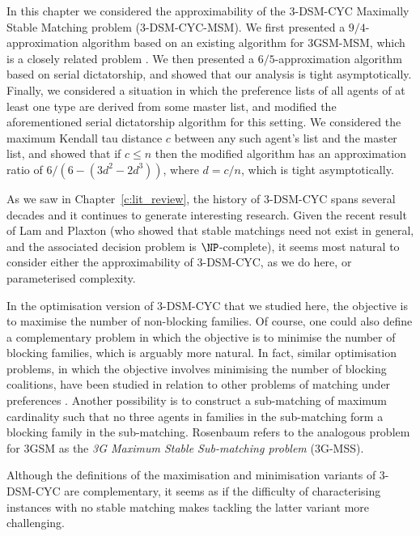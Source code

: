 In this chapter we considered the approximability of the 3-DSM-CYC Maximally Stable Matching problem (3-DSM-CYC-MSM). We first presented a $9/4$-approximation algorithm based on an existing algorithm for 3GSM-MSM, which is a closely related problem \cite{rosenbaum16}. We then presented a $6/5$-approximation algorithm based on serial dictatorship, and showed that our analysis is tight asymptotically. Finally, we considered a situation in which the preference lists of all agents of at least one type are derived from some master list, and modified the aforementioned serial dictatorship algorithm for this setting. We considered the maximum Kendall tau distance $c$ between any such agent's list and the master list, and showed that if $c \leq n$ then the modified algorithm has an approximation ratio of $6 / (6 - (3d^2 - 2d^3))$, where $d = c/n$, which is tight asymptotically.

As we saw in Chapter~\ref{c:lit_review}, the history of 3-DSM-CYC spans several decades and it continues to generate interesting research. Given the recent result of Lam and Plaxton \cite{Plaxton3DSMCYCJournal} (who showed that stable matchings need not exist in general, and the associated decision problem is $\NP$-complete), it seems most natural to consider either the approximability of 3-DSM-CYC, as we do here, or parameterised complexity. 

In the optimisation version of 3-DSM-CYC that we studied here, the objective is to maximise the number of non-blocking families. Of course, one could also define a complementary problem in which the objective is to minimise the number of blocking families, which is arguably more natural. In fact, similar optimisation problems, in which the objective involves minimising the number of blocking coalitions, have been studied in relation to other problems of matching under preferences \cite{BMM10, ABM06, Hamada16}. Another possibility is to construct a sub-matching of maximum cardinality such that no three agents in families in the sub-matching form a blocking family in the sub-matching. Rosenbaum \cite{rosenbaum16} refers to the analogous problem for 3GSM as the \emph{3G Maximum Stable Sub-matching problem} (3G-MSS). 

Although the definitions of the maximisation and minimisation variants of 3-DSM-CYC are complementary, it seems as if the difficulty of characterising instances with no stable matching makes tackling the latter variant more challenging.


